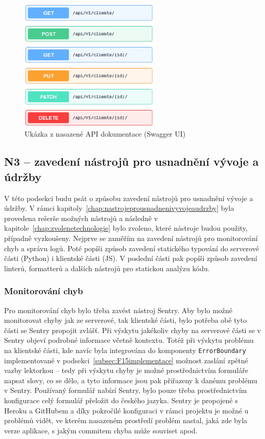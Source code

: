 \begin{figure}[h]\centering
    \includegraphics[width=0.6\textwidth]{img/swagger.png}
    \caption{Ukázka z nasazené API dokumentace (Swagger UI)}\label{fig:swagger}
\end{figure}

\subsection{N3 -- zavedení nástrojů pro usnadnění vývoje a údržby}\label{subsec:N3implementace}

V této podsekci budu psát o způsobu zavedení nástrojů pro usnadnění vývoje a údržby. V rámci kapitoly~\ref{chap:nastrojeprousnadnenivyvojeaudrzby} byla provedena rešerše možných nástrojů a následně v kapitole~\ref{chap:zvolenetechnologie} bylo zvoleno, které nástroje budou použity, případně vyzkoušeny. Nejprve se zaměřím na zavedení nástrojů pro monitorování chyb a správu logů. Poté popíši způsob zavedení statického typování do serverové části (Python) i klientské části (JS). V poslední části pak popíši způsob zavedení linterů, formatterů a dalších nástrojů pro statickou analýzu kódu.

\subsubsection{Monitorování chyb}

Pro monitorování chyb bylo třeba zavést nástroj Sentry. Aby bylo možné monitorovat chyby jak ze serverové, tak klientské části, bylo potřeba obě tyto části se Sentry propojit zvlášť. Při výskytu jakékoliv chyby na serverové části se v Sentry objeví podrobné informace včetně kontextu. Totéž při výskytu problému na klientské části, kde navíc byla integrována do komponenty \verb|ErrorBoundary| implementované v podsekci~\ref{subsec:F15implementace} možnost zaslání zpětné vazby lektorkou -- tedy při výskytu chyby je možné prostřednictvím formuláře napsat slovy, co se dělo, a tyto informace jsou pak přiřazeny k danému problému v Sentry. Používaný formulář nabízí Sentry, bylo pouze třeba prostřednictvím konfigurace celý formulář přeložit do českého jazyka. Sentry je propojené s Heroku a GitHubem a díky pokročilé konfiguraci v rámci projektu je možné u problémů vidět, ve kterém nasazeném prostředí problém nastal, jaká zde byla verze aplikace, s jakým commitem chyba může souviset apod.

